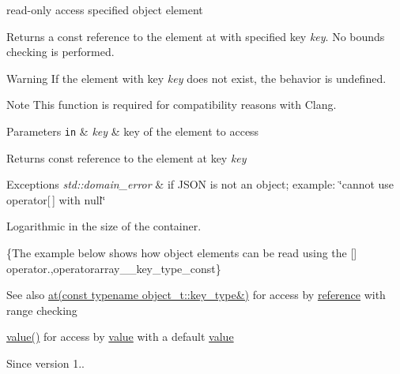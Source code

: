read-\/only access specified object element 

Returns a const reference to the element at with specified key {\itshape key}. No bounds checking is performed.

\begin{DoxyWarning}{Warning}
If the element with key {\itshape key} does not exist, the behavior is undefined.
\end{DoxyWarning}
\begin{DoxyNote}{Note}
This function is required for compatibility reasons with Clang.
\end{DoxyNote}

\begin{DoxyParams}[1]{Parameters}
\mbox{\tt in}  & {\em key} & key of the element to access\\
\hline
\end{DoxyParams}
\begin{DoxyReturn}{Returns}
const reference to the element at key {\itshape key} 
\end{DoxyReturn}

\begin{DoxyExceptions}{Exceptions}
{\em std\+::domain\+\_\+error} & if J\+S\+O\+N is not an object; example\+: {\ttfamily \char`\"{}cannot use
operator\mbox{[}$\,$\mbox{]} with null\char`\"{}}\\
\hline
\end{DoxyExceptions}
Logarithmic in the size of the container.

\{The example below shows how object elements can be read using the {\ttfamily \mbox{[}\mbox{]}} operator.,operatorarray\+\_\+\+\_\+key\+\_\+type\+\_\+const\}

\begin{DoxySeeAlso}{See also}
\hyperlink{classnlohmann_1_1basic__json_a7ed92d56cb313b243c1917696ffdf074}{at(const typename object\+\_\+t\+::key\+\_\+type\&)} for access by \hyperlink{classnlohmann_1_1basic__json_a3ec8e17be8732fe436e9d6733f52b7a3}{reference} with range checking 

\hyperlink{classnlohmann_1_1basic__json_a0a2cbbd95862a623e7dc5c37e67dead0}{value()} for access by \hyperlink{classnlohmann_1_1basic__json_a0a2cbbd95862a623e7dc5c37e67dead0}{value} with a default \hyperlink{classnlohmann_1_1basic__json_a0a2cbbd95862a623e7dc5c37e67dead0}{value}
\end{DoxySeeAlso}
\begin{DoxySince}{Since}
version 1.. 
\end{DoxySince}


